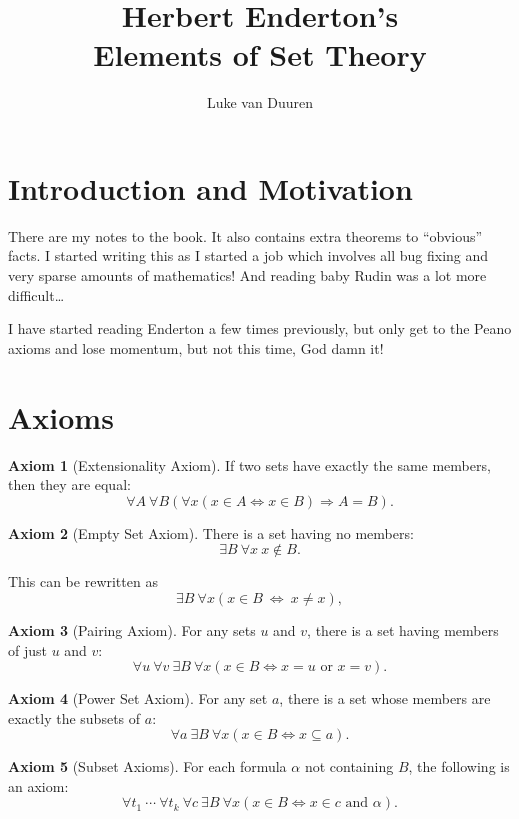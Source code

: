 \documentclass[12pt]{article}
\author{Luke van Duuren}
\title{Herbert Enderton's\\ Elements of Set Theory}
\theoremstyle{plain}
\theoremstyle{remark}
\theoremstyle{definition}
\newtheorem{axiom}{Axiom}[section]
\theoremstyle{remark}
\renewcommand{\iff}{\Leftrightarrow}
\begin{document}
\maketitle

\section{Introduction and Motivation}
There are my notes to the book. It also contains extra theorems to ``obvious'' facts. I started writing this as I started a job which involves all bug fixing and very sparse amounts of mathematics! And reading baby Rudin was a lot more difficult\ldots

I have started reading Enderton a few times previously, but only get to the Peano axioms and lose momentum, but not this time, God damn it!

\section{Axioms}
\begin{axiom}[Extensionality Axiom]\label{extensionality}
If two sets have exactly the same members, then they are equal:
\[
\forall A\ \forall B \left(\forall x(x \in A \Leftrightarrow x \in B) \Rightarrow A = B\right).
\]
\end{axiom}

\begin{axiom}[Empty Set Axiom] There is a set having no members:
\[
\exists B \ \forall x \ x \not\in B.
\]
\end{axiom}

This can be rewritten as
\[
\exists B \ \forall x (x \in B\ \iff\ x \neq x),
\]
\begin{axiom}[Pairing Axiom] For any sets $u$ and $v$, there is a set having members of just $u$ and $v$:
\[
\forall u\ \forall v\ \exists B\ \forall x(x \in B \Leftrightarrow x = u \text{ or } x = v).
\]
\end{axiom}

\begin{axiom}[Power Set Axiom] For any set $a$, there is a set whose members are exactly the subsets of $a$:
\[
\forall a\ \exists B\ \forall x(x \in B \Leftrightarrow x \subseteq a).
\]
\end{axiom}

\begin{axiom}[Subset Axioms]
For each formula $\alpha$ not containing $B$, the following is an axiom:
\[
\forall t_1\ \cdots\ \forall t_k\ \forall c\ \exists B\ \forall x(x \in B \Leftrightarrow x \in c \text{ and } \alpha).
\]
\end{axiom}
\end{document}

